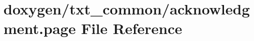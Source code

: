 \hypertarget{acknowledgment_8page}{\section{doxygen/txt\-\_\-common/acknowledgment.page File Reference}
\label{acknowledgment_8page}
}
